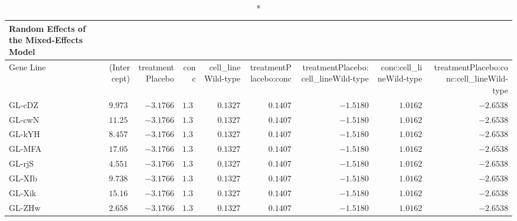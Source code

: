 \begin{longtable}{lrrrrrrrr}
\caption*{
{\large Random Effects of the Mixed-Effects Model}
} \\ 
\toprule
Gene Line & (Intercept) & treatmentPlacebo & conc & cell\_lineWild-type & treatmentPlacebo:conc & treatmentPlacebo:cell\_lineWild-type & conc:cell\_lineWild-type & treatmentPlacebo:conc:cell\_lineWild-type \\ 
\midrule\addlinespace[2.5pt]
GL-cDZ & $9.9730$ & $-3.1766$ & $1.3567$ & $0.1327$ & $0.1407$ & $-1.5180$ & $1.0162$ & $-2.6538$ \\ 
GL-cwN & $11.2540$ & $-3.1766$ & $1.3567$ & $0.1327$ & $0.1407$ & $-1.5180$ & $1.0162$ & $-2.6538$ \\ 
GL-kYH & $8.4574$ & $-3.1766$ & $1.3567$ & $0.1327$ & $0.1407$ & $-1.5180$ & $1.0162$ & $-2.6538$ \\ 
GL-MFA & $17.0530$ & $-3.1766$ & $1.3567$ & $0.1327$ & $0.1407$ & $-1.5180$ & $1.0162$ & $-2.6538$ \\ 
GL-rjS & $4.5512$ & $-3.1766$ & $1.3567$ & $0.1327$ & $0.1407$ & $-1.5180$ & $1.0162$ & $-2.6538$ \\ 
GL-XIb & $9.7384$ & $-3.1766$ & $1.3567$ & $0.1327$ & $0.1407$ & $-1.5180$ & $1.0162$ & $-2.6538$ \\ 
GL-Xik & $15.1602$ & $-3.1766$ & $1.3567$ & $0.1327$ & $0.1407$ & $-1.5180$ & $1.0162$ & $-2.6538$ \\ 
GL-ZHw & $2.6583$ & $-3.1766$ & $1.3567$ & $0.1327$ & $0.1407$ & $-1.5180$ & $1.0162$ & $-2.6538$ \\ 
\bottomrule
\end{longtable}

